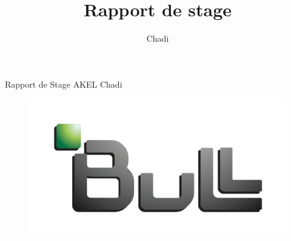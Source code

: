\documentclass[11pt]{article}
\title{Rapport de stage}
\author{Chadi \bsc{AKEL}}
\begin{document}
\textsf{}
\begin{center}
\LARGE{	Rapport de Stage} \newline
\LARGE{	AKEL Chadi} \newline
\end{center}
\begin{figure}[!h]
\begin{center}
\includegraphics[scale=0.4]{bull_logo.jpg}
\end{center}
\end{figure}
\end{document}

